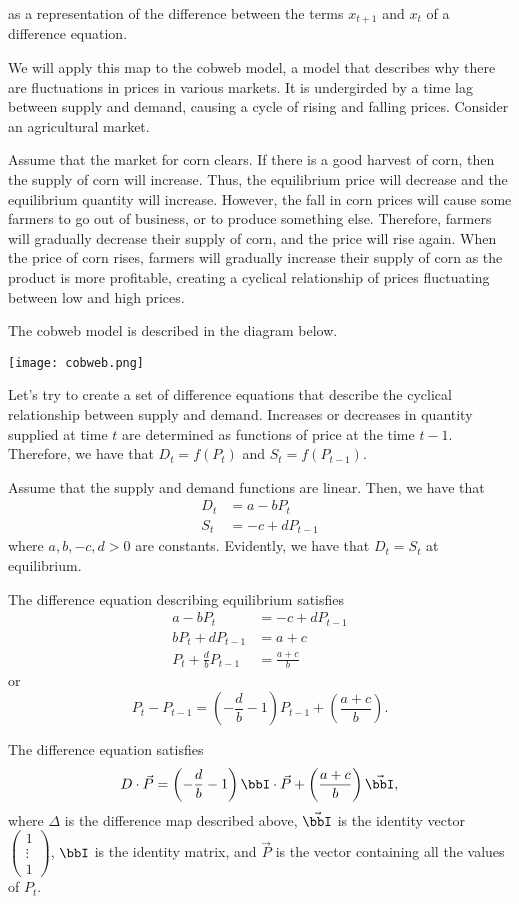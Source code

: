 \documentclass[a4paper, 12pt,oneside,openany]{book}
\begin{document}
as a representation of the difference between the terms $x_{t+1}$ and $x_t$ of a difference equation. 

We will apply this map to the cobweb model, a model that describes why there are fluctuations in prices in various markets. It is undergirded by a time lag between supply and demand, causing a cycle of rising and falling prices. Consider an agricultural market.

Assume that the market for corn clears. If there is a good harvest of corn, then the supply of corn will increase. Thus, the equilibrium price will decrease and the equilibrium quantity will increase. However, the fall in corn prices will cause some farmers to go out of business, or to produce something else. Therefore, farmers will gradually decrease their supply of corn, and the price will rise again. When the price of corn rises, farmers will gradually increase their supply of corn as the product is more profitable, creating a cyclical relationship of prices fluctuating between low and high prices.

The cobweb model is described in the diagram below.

\texttt{[image: cobweb.png]}

Let's try to create a set of difference equations that describe the cyclical relationship between supply and demand. Increases or decreases in quantity supplied at time $t$ are determined as functions of price at the time $t-1$. Therefore, we have that $D_t = f(P_t)$ and $S_t = f(P_{t-1})$.

Assume that the supply and demand functions are linear. Then, we have that \begin{align*}D_t &= a-bP_t \\ S_t &= -c+dP_{t-1} \end{align*} where $a, b, -c, d>0$ are constants. Evidently, we have that $D_t=S_t$ at equilibrium.

The difference equation describing equilibrium satisfies \begin{align*}a-bP_t &= -c+dP_{t-1} \\ bP_t+dP_{t-1} &= a+c \\ P_t + \frac{d}{b}P_{t-1} &= \frac{a+c}{b} \end{align*} or \begin{equation}P_t - P_{t-1} = \left(-\frac{d}{b}-1\right) P_{t-1} + \left(\frac{a+c}{b}\right). \end{equation}

The difference equation satisfies \begin{equation}D\cdot \vec{P} = \left(-\frac{d}{b}-1\right)\bbI \cdot \vec{P} + \left(\frac{a+c}{b}\right)\vec{\bbI},\end{equation} where $\Delta$ is the difference map described above, $\vec{\bbI}$ is the identity vector $\begin{pmatrix} 1 \\ \vdots \\ 1 \end{pmatrix}$, $\bbI$ is the identity matrix, and $\vec{P}$ is the vector containing all the values of $P_t$.
\end{document}
